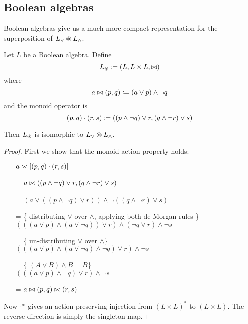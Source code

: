 \subsection{Boolean algebras}

Boolean algebras give us a much more compact representation for the
superposition of $L_\vee \circledast L_\wedge$.

\begin{prop}
  Let $L$ be a Boolean algebra. Define
  $$L_\circledast \coloneqq (L,L \times L,\bowtie)$$
  where
  $$a \bowtie (p, q) \coloneqq (a \vee p) \wedge \neg q$$
  and the monoid operator is
  $$(p, q) \cdot (r, s) \coloneqq ((p \wedge \neg q) \vee r, (q \wedge \neg r) \vee s)$$

  Then $L_\circledast$ is isomorphic to $L_\vee \circledast L_\wedge$.
\end{prop}
\begin{proof}
  First we show that the monoid action property holds:
  \begin{itemize}
    \item[ ]$a \bowtie \left[(p, q) \cdot (r, s)\right]$
    \item[=]$a \bowtie ((p \wedge \neg q) \vee r, (q \wedge \neg r) \vee s)$
    \item[=]$
      \left(
        a \vee
        \left(
          \left(
            p \wedge \neg q
          \right)
          \vee r
        \right)
      \right)
      \wedge \neg
      \left(
        \left(
          q \wedge \neg r
        \right)
        \vee s
      \right)$
    \item[=]\{ distributing $\vee$ over $\wedge$, applying both de Morgan rules \}\\
      $
      \left(
        \left(
          \left(  
            a \vee p
          \right)
          \wedge
          \left(
            a \vee \neg q
          \right)
        \right)
        \vee r
      \right)
      \wedge 
      \left(
        \neg q \vee r
      \right)
      \wedge
      \neg s
      $
    \item[=]\{ un-distributing $\vee$ over $\wedge $\}\\
      $
      \left(
        \left(
          \left(  
            a \vee p
          \right)
          \wedge
          \left(
            a \vee \neg q
          \right)
          \wedge
          \neg q
        \right)
        \vee r
      \right)
      \wedge
      \neg s
      $
    \item[=]\{ $(A \vee B) \wedge B = B$\}\\
      $
      \left(
        \left(
          \left(  
            a \vee p
          \right)
          \wedge
          \neg q
        \right)
        \vee r
      \right)
      \wedge
      \neg s
      $
    \item[=]$a \bowtie (p, q) \bowtie (r, s)$
  \end{itemize}

  Now $\cdot^\ast$ gives an action-preserving injection from $(L \times
  L)^\ast$ to $(L \times L)$. The reverse direction is simply the singleton map.
\end{proof}

